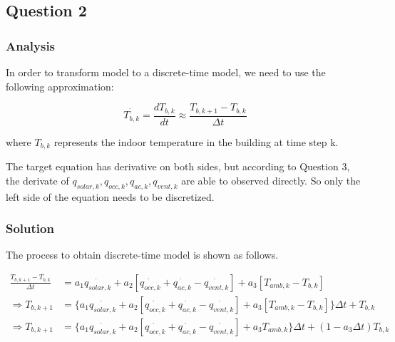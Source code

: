\documentclass[titlepage,a4paper]{article}
\begin{document}
\fi

    \setlength{\parindent}{0pt}
    \setlength{\parskip}{0.5em}

    \subsection{Question 2}

        \subsubsection{Analysis}

        In order to transform model to a discrete-time model, we need to use the following approximation:

        \begin{equation}
            \dot{T_{b,k}} = \frac{dT_{b,k}}{dt} \approx \frac{T_{b,k+1}-T_{b,k}}{\Delta t}
        \end{equation}

        where $T_{b,k}$ represents the indoor temperature in the building at time step k.

        The target equation has derivative on both sides, but according to Question 3, the derivate of $q_{solar,k}, q_{occ,k}, q_{ac,k}, q_{vent,k}$ are able to observed directly. So only the left side of the equation needs to be discretized.

        \subsubsection{Solution} \label{solution.Q2}

        The process to obtain discrete-time model is shown as follows.

        \begin{equation}
            \begin{aligned}
                \frac{T_{b,k+1}-T_{b,k}}{\Delta t} &=a_1 \dot{q_{solar,k}}+a_2[\dot{q_{occ,k}}+\dot{q_{ac,k}}-\dot{q_{vent,k}}]+a_3[T_{amb,k}-T_{b,k}] \\
                \Rightarrow T_{b,k+1} &= \{a_1 \dot{q_{solar,k}}+a_2[\dot{q_{occ,k}}+\dot{q_{ac,k}}-\dot{q_{vent,k}}]+a_3[T_{amb,k}-T_{b,k}] \} \Delta t+T_{b,k} \\
                \Rightarrow T_{b,k+1} &= \{a_1 \dot{q_{solar,k}}+a_2[\dot{q_{occ,k}}+\dot{q_{ac,k}}-\dot{q_{vent,k}}]+a_3T_{amb,k}\} \Delta t +(1-a_3 \Delta t)T_{b,k} \\              
            \end{aligned}
        \end{equation}
\end{document}
